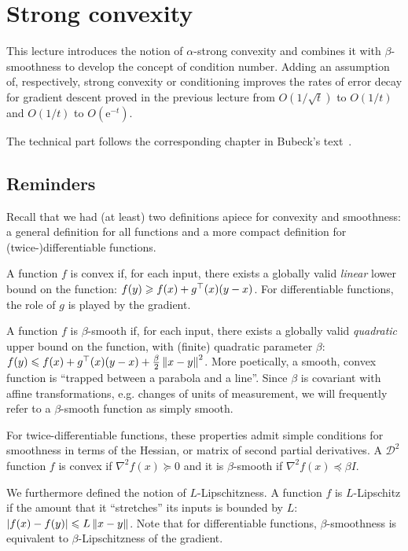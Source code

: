 \section{Strong convexity}

This lecture introduces the notion of $\alpha$-strong convexity and combines it
with $\beta$-smoothness to develop the concept of condition number.  Adding an
assumption of, respectively, strong convexity or conditioning improves the rates
of error decay for gradient descent proved in the previous lecture from
$O(1/\sqrt{t})$ to $O(1/t)$ and $O(1/t)$ to $O(\mathrm{e}^{-t})$.

The technical part follows the corresponding chapter in Bubeck's
text~\cite{Bubeck}.

\subsection{Reminders}

Recall that we had (at least) two definitions apiece for convexity and
smoothness: a general definition for all functions and a more compact definition
for (twice-)differentiable functions.

A function $f$ is convex if, for each input, there exists a globally valid
\emph{linear} lower bound on the function: $f(y) \geqslant f(x) + g^\top(x)(y-x)$.
For differentiable functions, the role of $g$ is played by the gradient.

A function $f$ is $\beta$-smooth if, for each input, there exists a globally
valid \emph{quadratic} upper bound on the function, with (finite) quadratic
parameter $\beta$: $f(y) \leqslant f(x) + g^\top(x)(y-x) +
\frac{\beta}{2}\left\lVert x-y\right\rVert^2$.  More poetically, a smooth, convex function is
``trapped between a parabola and a line''.  Since $\beta$ is covariant with
affine transformations, e.g. changes of units of measurement, we will frequently
refer to a $\beta$-smooth function as simply smooth.

For twice-differentiable functions, these properties admit simple conditions for
smoothness in terms of the Hessian, or matrix of second partial derivatives.  A
$\mathcal{D}^2$ function $f$ is convex if $\nabla^2f(x) \succeq 0$ and it is
$\beta$-smooth if $\nabla^2f(x) \preceq \beta I$.

We furthermore defined the notion of $L$-Lipschitzness.  A function $f$ is
$L$-Lipschitz if the amount that it ``stretches'' its inputs is bounded by $L$:
$\left\lvert f(x)-f(y)\right\rvert \leqslant L\left\lVert x-y\right\rVert$.  Note that for differentiable functions,
$\beta$-smoothness is equivalent to $\beta$-Lipschitzness of the gradient.

